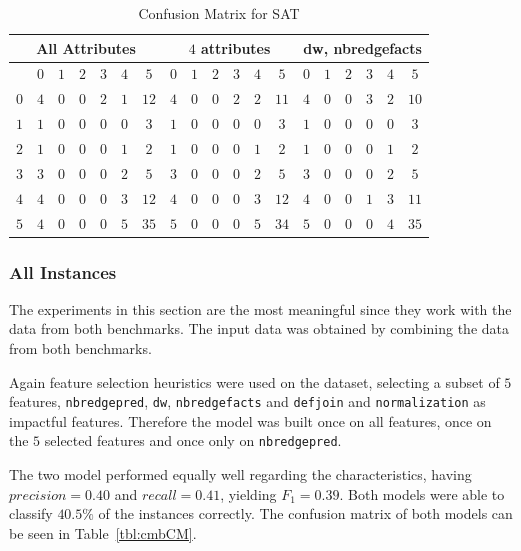 \begin{table}[h]
	\center
	\begin{tabular}{|c|cccccc|cccccc|cccccc|}
		\hline\multicolumn{7}{|c|}{All Attributes} &\multicolumn{6}{|c|}{$4$ attributes}&\multicolumn{6}{|c|}{dw, nbredgefacts}\\
		\hline &$0$&$1$&$2$&$3$&$4$&$5$&$0$&$1$&$2$&$3$&$4$&$5$&$0$&$1$&$2$&$3$&$4$&$5$\\
		\hline $0$ & $4$ & $0$ & $0$ & $2$ & $1$ & $12$& $4$ & $0$ & $0$ & $2$ & $2$ & $11$& $4$ & $0$ & $0$ & $3$ & $2$ & $10$\\
					 $1$ & $1$ & $0$ & $0$ & $0$ & $0$ & $3$ & $1$ & $0$ & $0$ & $0$ & $0$ & $3$ & $1$ & $0$ & $0$ & $0$ & $0$ & $3$\\
					 $2$ & $1$ & $0$ & $0$ & $0$ & $1$ & $2$ & $1$ & $0$ & $0$ & $0$ & $1$ & $2$ & $1$ & $0$ & $0$ & $0$ & $1$ & $2$\\
					 $3$ & $3$ & $0$ & $0$ & $0$ & $2$ & $5$ & $3$ & $0$ & $0$ & $0$ & $2$ & $5$ & $3$ & $0$ & $0$ & $0$ & $2$ & $5$\\
					 $4$ & $4$ & $0$ & $0$ & $0$ & $3$ & $12$& $4$ & $0$ & $0$ & $0$ & $3$ & $12$& $4$ & $0$ & $0$ & $1$ & $3$ & $11$\\
					 $5$ & $4$ & $0$ & $0$ & $0$ & $5$ & $35$& $5$ & $0$ & $0$ & $0$ & $5$ & $34$& $5$ & $0$ & $0$ & $0$ & $4$ & $35$\\
		\hline
	\end{tabular}
	\caption{Confusion Matrix for SAT}
	\label{tbl:satCME1}
\end{table}
\subsubsection{All Instances}
The experiments in this section are the most meaningful since they work with the data from both benchmarks. The input data was obtained by combining the data from both benchmarks.

Again feature selection heuristics were used on the dataset, selecting a subset of $5$ features, \lstinline$nbredgepred$, \lstinline$dw$, \lstinline$nbredgefacts$ and \lstinline$defjoin$ and \lstinline$normalization$ as impactful features. Therefore the model was built once on all features, once on the $5$ selected features and once only on \lstinline$nbredgepred$.

The two model performed equally well regarding the characteristics, having $precision=0.40$ and $recall=0.41$, yielding $F_1=0.39$. Both models were able to classify $40.5\%$ of the instances correctly. The confusion matrix of both models can be seen in Table~\ref{tbl:cmbCM}.

